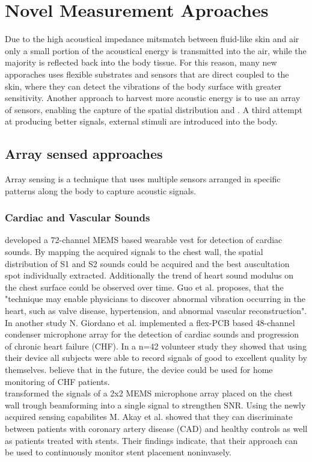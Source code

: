 \documentclass[
	ngerman,
	ruledheaders=section,%
	class=report,%
	thesis={type=report},%
	accentcolor=1c,%
	custommargins=false,%
	marginpar=false,%
	BCOR=5mm,%
	parskip=half-,%
	fontsize=11pt,%
]{tudapub}
\begin{document}
\chapter{Novel Measurement Aproaches }
Due to the high acoustical impedance mitsmatch between fluid-like skin and air only a small portion of the 
acoustical energy is transmitted into the air, while the majority is reflected back into the body tissue. 
For this reason, many new apporaches uses flexible substrates and sensors that are direct coupled to the skin, where they can detect the vibrations of the body surface with greater sensitivity.
Another approach to harvest more acoustic energy is to use an array of sensors, enabling the capture of the spatial distribution and .
A third attempt at producing better signals, external stimuli are introduced into the body. 

\section{Array sensed approaches}
Array sensing is a technique that uses multiple sensors arranged in specific patterns along the body to capture acoustic signals. 



\subsection{Cardiac and Vascular Sounds}
\cite{guo_development_2022} developed a 72-channel MEMS based wearable vest for detection of cardiac sounds. 
By mapping the acquired signals to the chest wall, the spatial distribution of S1 and S2 sounds could be acquired and the best auscultation spot individually extracted.
Additionally the trend of heart sound modulus on the chest surface could be observed over time.
Guo et al. proposes, that the "technique may enable physicians to discover abnormal vibration occurring in the heart, such as valve disease, hypertension, and abnormal vascular reconstruction".
\\
In another study N. Giordano et al. implemented a flex-PCB based 48-channel condenser microphone array for the detection of cardiac sounds and progression of chronic heart failure (CHF). 
In a n=42 volunteer study they showed that using their device all subjects were able to record signals of good to excellent quality by themselves. 
\cite{giordano_wearable_2023} believe that in the future, the device could be used for home monitoring of CHF patients.
\\
\cite{akay_assessment_2016} transformed the signals of a 2x2 MEMS microphone array placed on the chest wall trough beamforming into a single signal to strengthen SNR. 
Using the newly acquired sensing capabilites M. Akay et al. showed that they can discriminate between patients with coronary artery disease (CAD) and healthy controls as well as patients treated with stents. 
Their findings indicate, that their approach can be used to continuously monitor stent placement noninvasely. 
\end{document}

